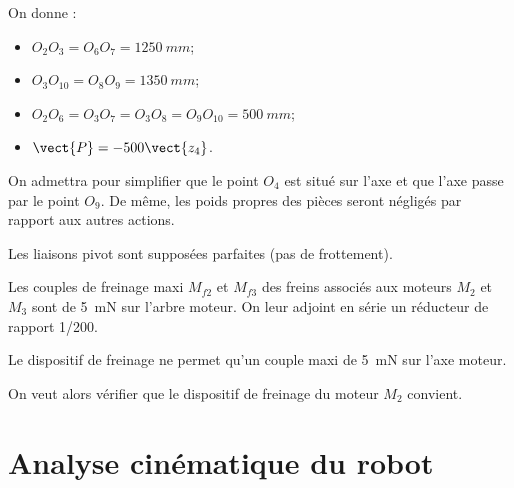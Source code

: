 {On donne : 
\begin{itemize}
\item $O_2O_3 = O_6O_7 = \SI{1250}{mm}$; 
\item $O_3O_{10} = O_8O_9 = \SI{1350}{mm}$; 
\item $O_2O_6 = O_3O_7 = O_3O_8 = O_9O_{10} = \SI{500}{mm}$; 
\item $\vect{P} = -500\vect{z_4}$. 
\end{itemize}

On admettra pour simplifier que le point $O_4$ est situé sur l’axe  et que l’axe  passe par le point $O_9$. De même, les poids propres des pièces seront négligés par rapport aux autres 
actions. 

Les liaisons pivot sont supposées parfaites (pas de frottement). 

Les couples de freinage maxi $M_{f2}$ et $M_{f3}$ des freins associés aux moteurs $M_2$ et $M_3$ sont de 
\SI{5}{mN} sur l’arbre moteur. On leur adjoint en série un réducteur de rapport 1/200.



Le dispositif de freinage ne permet qu’un couple maxi de \SI{5}{mN} sur l’axe 
moteur. 




On veut alors vérifier que le dispositif de freinage du moteur $M_2$ convient. 




\section{Analyse cinématique du robot}

}
